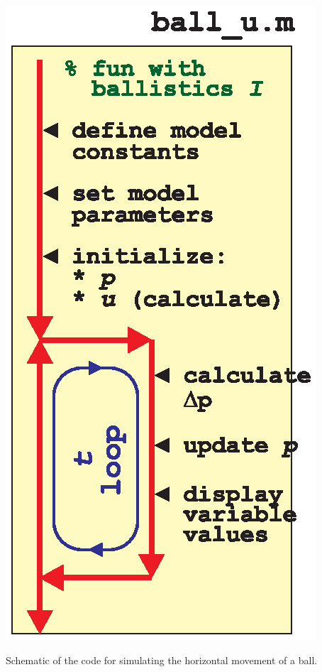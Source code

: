 \documentclass{tufte-book} %
\begin{document}
\newpage
%
\begin{marginfigure}[0.0in]
\includegraphics[width=\linewidth]{ch9-schematic-ball_u.eps}
\caption{Schematic of the code for simulating the horizontal movement of a ball.}
\label{fig:ch9-schematic-ball_u}
\end{marginfigure}
\end{document}

